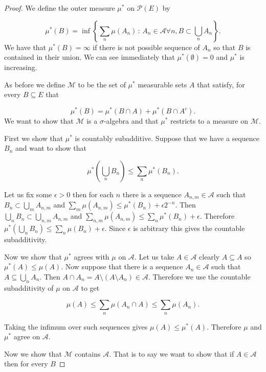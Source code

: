 \documentclass[
]{book}
\theoremstyle{definition}
\theoremstyle{definition}
\theoremstyle{definition}
\theoremstyle{definition}
\theoremstyle{remark}
\begin{document}
\begin{proof}
We define the outer measure \(\mu^*\) on \(\mathscr{P}(E)\) by

\[ \mu^*(B) = \inf \left\{ \sum_n \mu(A_n) \,:\, A_n \in \mathcal{A} \forall n, B \subset \bigcup_n A_n \right\}.\]
We have that \(\mu^*(B) = \infty\) if there is not possible sequence of \(A_n\) so that \(B\) is contained in their union. We can see immediately that \(\mu^*(\emptyset) =0\) and \(\mu^*\) is increasing.

As before we define \(\mathscr{M}\) to be the set of \(\mu^*\) measurable sets \(A\) that satisfy, for every \(B \subseteq E\) that

\[ \mu^*(B) = \mu^*(B \cap A) + \mu^*(B \cap A^c).  \]
We want to show that \(\mathscr{M}\) is a \(\sigma\)-algebra and that \(\mu^*\) restricts to a measure on \(\mathscr{M}\).

First we show that \(\mu^*\) is countably subadditive. Suppose that we have a sequence \(B_n\) and want to show that

\[ \mu^*\left( \bigcup_n B_n\right) \leq \sum_n \mu^*(B_n). \]

Let us fix some \(\epsilon >0\) then for each \(n\) there is a sequence \(A_{n,m} \in \mathcal{A}\) such that \(B_n \subset \bigcup_m A_{n,m}\) and \(\sum_m \mu(A_{n,m}) \leq \mu^*(B_n) + \epsilon 2^{-n}\). Then \(\bigcup_n B_n \subset \bigcup_{n,m} A_{n,m}\) and \(\sum_{n,m}\mu(A_{n,m}) \leq \sum_n \mu^*(B_n) + \epsilon\). Therefore \(\mu^* \left( \bigcup_n B_n \right) \leq \sum_n \mu(B_n) + \epsilon\). Since \(\epsilon\) is arbitrary this gives the countable subadditivity.

Now we show that \(\mu^*\) agrees with \(\mu\) on \(\mathcal{A}\). Let us take \(A \in \mathcal{A}\) clearly \(A \subseteq A\) so \(\mu^*(A) \leq \mu(A)\). Now suppose that there is a sequence \(A_n \in \mathcal{A}\) such that \(A \subseteq \bigcup_n A_n\). Then \(A \cap A_n = A \setminus (A \setminus A_n) \in \mathcal{A}\). Therefore we use the countable subadditivity of \(\mu\) on \(\mathcal{A}\) to get

\[ \mu (A) \leq  \sum_n \mu(A_n \cap A) \leq \sum_n \mu(A_n).\]

Taking the infimum over such sequences gives \(\mu(A) \leq \mu^*(A)\). Therefore \(\mu\) and \(\mu^*\) agree on \(\mathcal{A}\).

Now we show that \(\mathscr{M}\) contains \(\mathcal{A}\). That is to say we want to show that if \(A \in \mathcal{A}\) then for every \(B\)


\end{proof}
\end{document}
